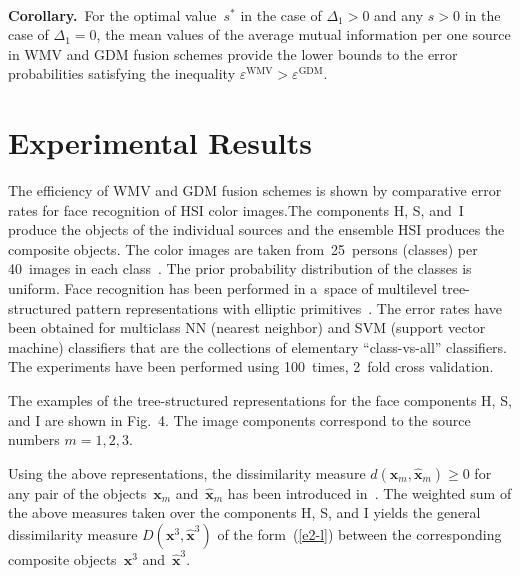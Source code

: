 \begin{multicols}{2}
\begin{figure*}[b] %
 \vspace*{1pt}
    \begin{center}  
  \mbox{%
 \epsfxsize=163mm 
 }
\end{center}
\vspace*{-9pt}
\end{figure*}
  



\noindent
\textbf{Corollary.}\ For the optimal value~$s^*$ in the case of $\Delta_1>0$ and any 
$s>0$ in the case of $\Delta_1=0$, the mean values of the average mutual information 
per one source in WMV and GDM fusion schemes provide the lower bounds to the 
error probabilities satisfying the inequality 
$\varepsilon^{\mathrm{WMV}}>\varepsilon^{\mathrm{GDM}}$.

\section{Experimental Results}

\noindent
The efficiency of WMV and GDM fusion schemes is shown by comparative error 
rates for face recognition of HSI color images.The components H, S, and~I produce the 
objects of the individual sources and the ensemble HSI produces the composite 
objects. The color images are taken from~25~persons (classes) per 40~images in 
each class~\cite{13-l}.  The prior probability distribution of the classes is uniform. 
Face recognition has been performed in a~space of multilevel tree-structured 
pattern representations with elliptic primitives~\cite{5-l}. The error rates have 
been obtained for multiclass NN (nearest neighbor) and SVM (support vector 
machine) classifiers that are the collections of elementary ``class-vs-all'' classifiers. 
The experiments have been performed using 100~times, 2~fold cross validation. 

The examples of the tree-structured representations for the face components H, S, and I 
are shown in Fig.~4. The image components correspond to the source numbers 
$m=1, 2, 3$.


Using the above representations, the dissimilarity measure 
$d(\mathbf{x}_m, \hat{\mathbf{x}}_m)\geq 0$  for any pair 
of the objects~$\mathbf{x}_m$ and~$\hat{\mathbf{x}}_m$ has been introduced 
in~\cite{14-l}.
The weighted sum of the above measures taken over the components 
H, S, and I yields the general dissimilarity measure $D(\mathbf{x}^3, 
\hat{\mathbf{x}}^3)$  of the form~(\ref{e2-l}) between the corresponding 
composite objects~$\mathbf{x}^3$ and~$\hat{\mathbf{x}}^3$. 


\end{multicols}
